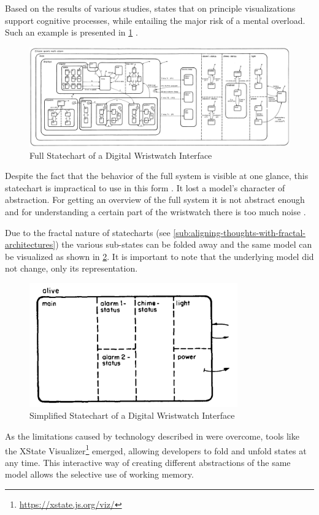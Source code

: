 Based on the results of various studies, \textcite{dutke_mentale_1994} states that on principle visualizations support cognitive processes, while entailing the major risk of a mental overload.
Such an example is presented in \cref{fig:full-wristwatch-statechart} \autocite{harel_statecharts:_1987}.
\begin{figure}[h]
\centering
\includegraphics[width=\textwidth]{images/full-watch-statechart}
\caption{Full Statechart of a Digital Wristwatch Interface}
\label{fig:full-wristwatch-statechart}
\end{figure}
Despite the fact that the behavior of the full system is visible at one glance, this statechart is impractical to use in this form \autocite{harel_statecharts:_1987}.
It lost a model's character of abstraction.
For getting an overview of the full system it is not abstract enough and for understanding a certain part of the wristwatch there is too much noise \autocite{dutke_mentale_1994}.

Due to the fractal nature of statecharts (see \cref{sub:aligning-thoughts-with-fractal-architectures}) the various sub-states can be folded away and the same model can be visualized as shown in \cref{fig:simplified-wristwatch-statechart}.
It is important to note that the underlying model did not change, only its representation.
\begin{figure}[h]
\centering
\includegraphics[width=0.8\textwidth]{images/abstract-watch-statechart}
\caption{Simplified Statechart of a Digital Wristwatch Interface}
\label{fig:simplified-wristwatch-statechart}
\end{figure}
As the limitations caused by technology described in \textcite{harel_statecharts:_1987} were overcome, tools like the XState Visualizer\footnote{\url{https://xstate.js.org/viz/}} emerged, allowing developers to fold and unfold states at any time.
This interactive way of creating different abstractions of the same model allows the selective use of working memory.

